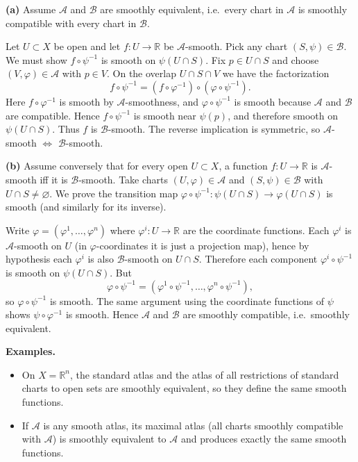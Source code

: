 \documentclass[12pt,a4paper]{article}
\theoremstyle{plain}
\theoremstyle{definition}      %
\begin{document}
\smallskip
\noindent\textbf{(a)}
Assume $\mathcal A$ and $\mathcal B$ are smoothly equivalent, i.e.\ every chart in $\mathcal A$ is smoothly compatible
with every chart in $\mathcal B$.

Let $U\subset X$ be open and let $f:U\to\mathbb R$ be $\mathcal A$-smooth.
Pick any chart $(S,\psi)\in\mathcal B$. We must show $f\circ\psi^{-1}$ is smooth on $\psi(U\cap S)$.
Fix $p\in U\cap S$ and choose $(V,\varphi)\in\mathcal A$ with $p\in V$.
On the overlap $U\cap S\cap V$ we have the factorization
\[
f\circ\psi^{-1}
=
(f\circ\varphi^{-1})\circ(\varphi\circ\psi^{-1}).
\]
Here $f\circ\varphi^{-1}$ is smooth by $\mathcal A$-smoothness, and $\varphi\circ\psi^{-1}$ is smooth
because $\mathcal A$ and $\mathcal B$ are compatible. Hence $f\circ\psi^{-1}$ is smooth near $\psi(p)$,
and therefore smooth on $\psi(U\cap S)$. Thus $f$ is $\mathcal B$-smooth.
The reverse implication is symmetric, so $\mathcal A$-smooth $\Leftrightarrow$ $\mathcal B$-smooth.

\smallskip
\noindent\textbf{(b)}
Assume conversely that for every open $U\subset X$, a function $f:U\to\mathbb R$ is $\mathcal A$-smooth iff it is $\mathcal B$-smooth.
Take charts $(U,\varphi)\in\mathcal A$ and $(S,\psi)\in\mathcal B$ with $U\cap S\neq\varnothing$.
We prove the transition map $\varphi\circ\psi^{-1}:\psi(U\cap S)\to\varphi(U\cap S)$ is smooth (and similarly for its inverse).

Write $\varphi=(\varphi^1,\dots,\varphi^n)$ where $\varphi^i:U\to\mathbb R$ are the coordinate functions.
Each $\varphi^i$ is $\mathcal A$-smooth on $U$ (in $\varphi$-coordinates it is just a projection map),
hence by hypothesis each $\varphi^i$ is also $\mathcal B$-smooth on $U\cap S$.
Therefore each component $\varphi^i\circ\psi^{-1}$ is smooth on $\psi(U\cap S)$.
But
\[
\varphi\circ\psi^{-1}=(\varphi^1\circ\psi^{-1},\dots,\varphi^n\circ\psi^{-1}),
\]
so $\varphi\circ\psi^{-1}$ is smooth. The same argument using the coordinate functions of $\psi$
shows $\psi\circ\varphi^{-1}$ is smooth. Hence $\mathcal A$ and $\mathcal B$ are smoothly compatible,
i.e.\ smoothly equivalent.

\medskip
\noindent\textbf{Examples.}
\begin{itemize}
	\item On $X=\mathbb R^n$, the standard atlas and the atlas of all restrictions of standard charts to open sets are smoothly equivalent,
	so they define the same smooth functions.
	\item If $\mathcal A$ is any smooth atlas, its maximal atlas (all charts smoothly compatible with $\mathcal A$)
	is smoothly equivalent to $\mathcal A$ and produces exactly the same smooth functions.
\end{itemize}
\end{document}
